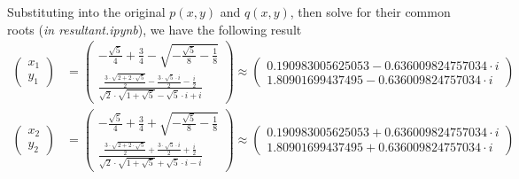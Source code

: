 \documentclass[conference,onecolumn]{IEEEtran}
\begin{document}
\begin{enumerate}[label=\arabic{enumi}.]
\begin{enumerate}
                    Substituting into the original $p(x, y)$ and $q(x, y)$, then solve for their common roots (\textit{in resultant.ipynb}), we have the following result
                    \begin{align*}
                        \begin{pmatrix}
                            x_1 \\
                            y_1
                        \end{pmatrix} & = \begin{pmatrix}
                            -\frac{\sqrt{5}}{4} + \frac{3}{4} - \sqrt{-\frac{\sqrt{5}}{8} - \frac{1}{8}} \\
                            \frac{\frac{3 \cdot \sqrt{2 + 2 \cdot \sqrt{5}}}{2} - \frac{3 \cdot \sqrt{5} \cdot i}{2} - \frac{i}{2}}{\sqrt{2} \cdot \sqrt{1 + \sqrt{5}} - \sqrt{5} \cdot i + i}
                        \end{pmatrix} \approx
                        \begin{pmatrix}
                            0.190983005625053 - 0.636009824757034 \cdot i \\
                            1.80901699437495 - 0.636009824757034 \cdot i
                        \end{pmatrix}                                        \\
                        \begin{pmatrix}
                            x_2 \\
                            y_2
                        \end{pmatrix} & = \begin{pmatrix}
                            -\frac{\sqrt{5}}{4} + \frac{3}{4} + \sqrt{-\frac{\sqrt{5}}{8} - \frac{1}{8}} \\
                            \frac{\frac{3 \cdot \sqrt{2 + 2 \cdot \sqrt{5}}}{2} + \frac{3 \cdot \sqrt{5} \cdot i}{2} + \frac{i}{2}}{\sqrt{2} \cdot \sqrt{1 + \sqrt{5}} + \sqrt{5} \cdot i - i}
                        \end{pmatrix} \approx
                        \begin{pmatrix}
                            0.190983005625053 + 0.636009824757034 \cdot i \\
                            1.80901699437495 + 0.636009824757034 \cdot i
                        \end{pmatrix}                                        \\

\end{align*}
\end{enumerate}
\end{enumerate}
\end{document}

